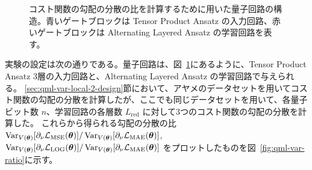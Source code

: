 \begin{figure}[H]
    \caption{コスト関数の勾配の分散の比を計算するために用いた量子回路の構造。青いゲートブロックは Tensor Product Ansatz の入力回路、赤いゲートブロックは Alternating Layered Ansatz の学習回路を表す。}
    \label{fig:tpa-alt-circuit}
\end{figure}

実験の設定は次の通りである。量子回路は、図~\ref{fig:tpa-alt-circuit}にあるように、Tensor Product Ansatz 3層の入力回路と、Alternating Layered Ansatz の学習回路で与えられる。
\ref{sec:qml-var-local-2-design}節において、アヤメのデータセットを用いてコスト関数の勾配の分散を計算したが、ここでも同じデータセットを用いて、各量子ビット数 $n$、学習回路の各層数 $L_{\text{red}}$ に対して3つのコスト関数の勾配の分散を計算した。
これらから得られる勾配の分散の比 $\operatorname{Var}_{V(\boldsymbol{\theta})}[\partial_\nu\mathcal{L}_{\mathrm{MSE}}(\boldsymbol{\theta})]/\operatorname{Var}_{V(\boldsymbol{\theta})}[\partial_\nu\mathcal{L}_{\mathrm{MAE}}(\boldsymbol{\theta})]$, $\operatorname{Var}_{V(\boldsymbol{\theta})}[\partial_\nu\mathcal{L}_{\mathrm{LOG}}(\boldsymbol{\theta})]/\operatorname{Var}_{V(\boldsymbol{\theta})}[\partial_\nu\mathcal{L}_{\mathrm{MAE}}(\boldsymbol{\theta})]$ をプロットしたものを図~\ref{fig:qml-var-ratio}に示す。

